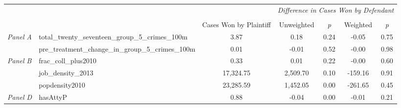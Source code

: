 \begin{tabular}{llccccc}
\toprule
 &  & \textit{} & \multicolumn{4}{c}{\textit{Difference in Cases Won by Defendant}} \\
\cline{4-7}
\\
 &  & Cases Won by Plaintiff & Unweighted & \emph{p} & Weighted & \emph{p} \\
\midrule
\multirow[c]{2}{3cm}{\textit{Panel A}} & total_twenty_seventeen_group_5_crimes_100m & 3.87 & 0.18 & 0.24 & -0.05 & 0.75 \\
 & pre_treatment_change_in_group_5_crimes_100m & 0.01 & -0.01 & 0.52 & -0.00 & 0.98 \\
\cline{1-7}
\multirow[c]{3}{3cm}{\textit{Panel B}} & frac_coll_plus2010 & 0.33 & 0.01 & 0.22 & -0.00 & 0.60 \\
 & job_density_2013 & 17,324.75 & 2,509.70 & 0.10 & -159.16 & 0.91 \\
 & popdensity2010 & 23,285.59 & 1,452.05 & 0.00 & -261.65 & 0.45 \\
\cline{1-7}
\textit{Panel D} & hasAttyP & 0.88 & -0.04 & 0.00 & -0.01 & 0.21 \\
\cline{1-7}
\bottomrule
\end{tabular}
